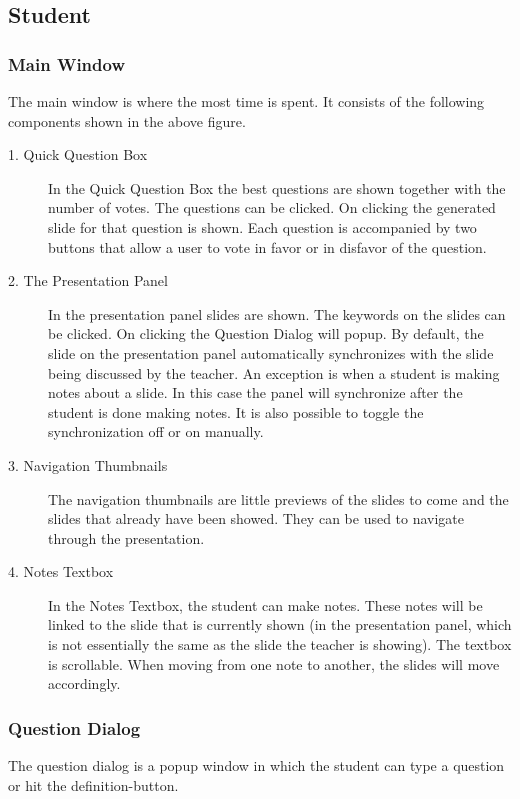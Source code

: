 \documentclass[11pt]{article}
\begin{document}
\subsection{Student}
\label{studentInterface}
\subsubsection{Main Window}
The main window is where the most time is spent. It consists of the following components shown in the above figure.
\begin{description}
\item[1. Quick Question Box] In the Quick Question Box the best questions are shown together with the number of votes. The questions can be clicked. On clicking the generated slide for that question is shown. Each question is accompanied by two buttons that allow a user to vote in favor or in disfavor of the question. 

\item[2. The Presentation Panel] In the presentation panel slides are shown. The keywords on the slides can be clicked. On clicking the Question Dialog will popup. By default, the slide on the presentation panel automatically synchronizes with the slide being discussed by the teacher. An exception is when a student is making notes about a slide. In this case the panel will synchronize after the student is done making notes. It is also possible to toggle the synchronization off or on manually.  

\item[3. Navigation Thumbnails] The navigation thumbnails are little previews of the slides to come and the slides that already have been showed. They can be used to navigate through the presentation.

\item[4. Notes Textbox] In the Notes Textbox, the student can make notes. These notes will be linked to the slide that is currently shown (in the presentation panel, which is not essentially the same as the slide the teacher is showing). The textbox is scrollable. When moving from one note to another, the slides will move accordingly. 
\end{description}

\subsubsection{Question Dialog}
The question dialog is a popup window in which the student can type a question or hit the definition-button.
\end{document}

